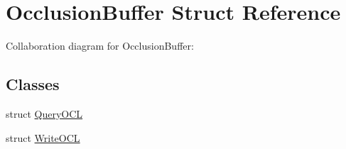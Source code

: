 \hypertarget{struct_occlusion_buffer}{\section{Occlusion\+Buffer Struct Reference}
\label{struct_occlusion_buffer}
}


Collaboration diagram for Occlusion\+Buffer\+:
\subsection*{Classes}
\begin{DoxyCompactItemize}
\item 
struct \hyperlink{struct_occlusion_buffer_1_1_query_o_c_l}{Query\+O\+C\+L}
\item 
struct \hyperlink{struct_occlusion_buffer_1_1_write_o_c_l}{Write\+O\+C\+L}
\end{DoxyCompactItemize}
